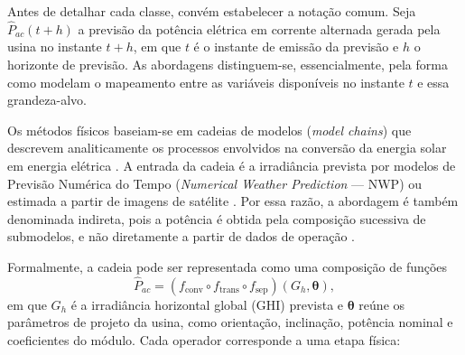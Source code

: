 Antes de detalhar cada classe, convém estabelecer a notação comum. Seja $\hat{P}_{ac}(t+h)$
a previsão da potência elétrica em corrente alternada gerada pela usina no instante
$t+h$, em que $t$ é o instante de emissão da previsão e $h$ o horizonte de previsão.
As abordagens distinguem-se, essencialmente, pela forma como modelam o mapeamento entre
as variáveis disponíveis no instante $t$ e essa grandeza-alvo.

Os métodos físicos baseiam-se em cadeias de modelos (\textit{model chains}) que descrevem
analiticamente os processos envolvidos na conversão da energia solar em energia elétrica
\cite{Markovics2022}. A entrada da cadeia é a irradiância prevista por modelos de
Previsão Numérica do Tempo (\textit{Numerical Weather Prediction} --- NWP) ou estimada a
partir de imagens de satélite \cite{Andrade2023}. Por essa razão, a abordagem é também
denominada indireta, pois a potência é obtida pela composição sucessiva de
submodelos, e não diretamente a partir de dados de operação \cite{Markovics2022}.

Formalmente, a cadeia pode ser representada como uma composição de funções
\begin{equation}
    \hat{P}_{ac} = (f_{\mathrm{conv}} \circ f_{\mathrm{trans}} \circ f_{\mathrm{sep}})(G_{h}, \boldsymbol{\theta}),
    \label{eq:model_chain}
\end{equation}
em que $G_{h}$ é a irradiância horizontal global (GHI) prevista e $\boldsymbol{\theta}$
reúne os parâmetros de projeto da usina, como orientação, inclinação, potência nominal e
coeficientes do módulo. Cada operador corresponde a uma etapa física:

